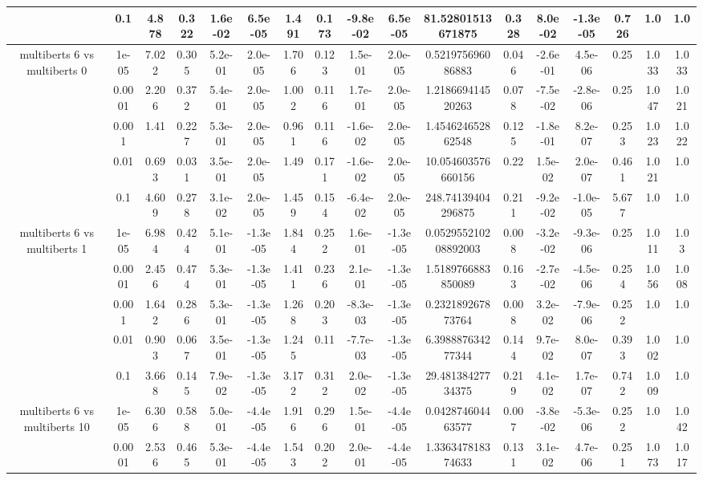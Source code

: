\begin{tabular}{|c|c|c|c|c|c|c|c|c|c|c|c|c|c|c|c|c|}
 & 0.1 & 4.878 & 0.322 & 1.6e-02 & 6.5e-05 & 1.491 & 0.173 & -9.8e-02 & 6.5e-05 & 81.52801513671875 & 0.328 & 8.0e-02 & -1.3e-05 & 0.726 & 1.0 & 1.0 \\
\hline
\multirow{5}{*}{multiberts 6 vs multiberts 0} & 1e-05 & 7.022 & 0.305 & 5.2e-01 & 2.0e-05 & 1.706 & 0.123 & 1.5e-01 & 2.0e-05 & 0.521975696086883 & 0.046 & -2.6e-01 & 4.5e-06 & 0.25 & 1.033 & 1.033 \\
 & 0.0001 & 2.206 & 0.372 & 5.4e-01 & 2.0e-05 & 1.002 & 0.116 & 1.7e-01 & 2.0e-05 & 1.218669414520263 & 0.078 & -7.5e-02 & -2.8e-06 & 0.25 & 1.047 & 1.021 \\
 & 0.001 & 1.41 & 0.227 & 5.3e-01 & 2.0e-05 & 0.961 & 0.116 & -1.6e-02 & 2.0e-05 & 1.454624652862548 & 0.125 & -1.8e-01 & 8.2e-07 & 0.253 & 1.023 & 1.022 \\
 & 0.01 & 0.693 & 0.031 & 3.5e-01 & 2.0e-05 & 1.49 & 0.171 & -1.6e-02 & 2.0e-05 & 10.054603576660156 & 0.22 & 1.5e-02 & 2.0e-07 & 0.461 & 1.021 & 1.0 \\
 & 0.1 & 4.609 & 0.278 & 3.1e-02 & 2.0e-05 & 1.459 & 0.154 & -6.4e-02 & 2.0e-05 & 248.74139404296875 & 0.211 & -9.2e-02 & -1.0e-05 & 5.677 & 1.0 & 1.0 \\
\hline
\multirow{5}{*}{multiberts 6 vs multiberts 1} & 1e-05 & 6.984 & 0.424 & 5.1e-01 & -1.3e-05 & 1.844 & 0.252 & 1.6e-01 & -1.3e-05 & 0.052955210208892003 & 0.008 & -3.2e-02 & -9.3e-06 & 0.25 & 1.011 & 1.03 \\
 & 0.0001 & 2.456 & 0.474 & 5.3e-01 & -1.3e-05 & 1.411 & 0.236 & 2.1e-01 & -1.3e-05 & 1.5189766883850089 & 0.163 & -2.7e-02 & -4.5e-06 & 0.254 & 1.056 & 1.008 \\
 & 0.001 & 1.642 & 0.286 & 5.3e-01 & -1.3e-05 & 1.268 & 0.203 & -8.3e-03 & -1.3e-05 & 0.232189267873764 & 0.008 & 3.2e-02 & -7.9e-06 & 0.252 & 1.0 & 1.0 \\
 & 0.01 & 0.903 & 0.067 & 3.5e-01 & -1.3e-05 & 1.245 & 0.11 & -7.7e-03 & -1.3e-05 & 6.398887634277344 & 0.144 & 9.7e-02 & 8.0e-07 & 0.393 & 1.002 & 1.0 \\
 & 0.1 & 3.668 & 0.145 & 7.9e-02 & -1.3e-05 & 3.172 & 0.312 & 2.0e-02 & -1.3e-05 & 29.48138427734375 & 0.219 & 4.1e-02 & 1.7e-07 & 0.742 & 1.009 & 1.0 \\
\hline
\multirow{5}{*}{multiberts 6 vs multiberts 10} & 1e-05 & 6.306 & 0.588 & 5.0e-01 & -4.4e-05 & 1.916 & 0.296 & 1.5e-01 & -4.4e-05 & 0.042874604463577 & 0.007 & -3.8e-02 & -5.3e-06 & 0.252 & 1.0 & 1.042 \\
 & 0.0001 & 2.536 & 0.465 & 5.3e-01 & -4.4e-05 & 1.543 & 0.202 & 2.0e-01 & -4.4e-05 & 1.336347818374633 & 0.131 & 3.1e-02 & 4.7e-06 & 0.251 & 1.073 & 1.017 \\

\end{tabular}
